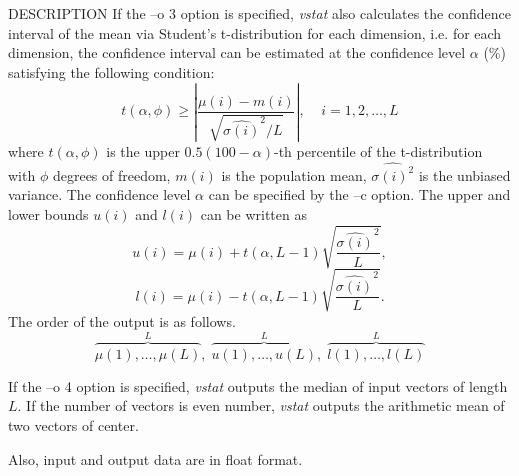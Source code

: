 \begin{qsection}{DESCRIPTION}
If the --o 3 option is specified, {\em vstat} also calculates the confidence
interval of the mean via Student's t-distribution for each dimension,
i.e. for each dimension, the confidence interval can be estimated
at the confidence level $\alpha$ (\%) satisfying the following condition:
 \begin{displaymath}
  t(\alpha, \phi) \geq
  \left| \frac{\mu(i) -m(i)}{\sqrt{\hat{\sigma(i)}^{2} / L} }\right|
  ,   \;\;\;\; i = 1,  2, \dots, L
 \end{displaymath}
where $t(\alpha, \phi)$ is the upper $0.5(100 - \alpha)$-th percentile
of the t-distribution with $\phi$ degrees of freedom,
$m(i)$ is the population mean, $\hat{\sigma(i)^{2}}$ is the unbiased variance.
The confidence level $\alpha$ can be specified by the --c option.
The upper and lower bounds $u(i)$ and $l(i)$ can be written as
 \begin{displaymath}
  u(i) = \mu(i) + t(\alpha, L - 1) \sqrt{\frac{\hat{\sigma(i)}^{2}}{L}},
 \end{displaymath}
 \begin{displaymath}
  l(i) = \mu(i) - t(\alpha, L - 1) \sqrt{\frac{\hat{\sigma(i)}^{2}}{L}}.
 \end{displaymath}
The order of the output is as follows.
 \begin{displaymath}
  \overbrace{\mu(1),\dots,\mu(L)}^L, \; \overbrace{u(1),\dots,u(L)}^L,
    \;\overbrace{l(1),\dots,l(L)}^L
 \end{displaymath}

If the --o 4 option is specified, {\em vstat} outputs the median of 
input vectors of length $L$.
If the number of vectors is even number, {\em vstat} outputs the 
arithmetic mean of two vectors of center.
 

Also, input and output data are in float format.
\end{qsection}

\begin{options}
\end{options}

